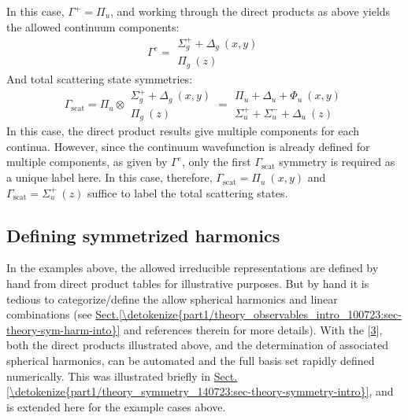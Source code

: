 \documentclass[letterpaper,table,10pt,english]{jupyterBook}
\begin{document}
\sphinxAtStartPar
In this case, \(\Gamma^{+} = \Pi_u\), and \sphinxhyphen{} working through the direct products as above \sphinxhyphen{} yields the allowed continuum components:
\label{equation:part2/sym-fitting-intro_220423:1599210e-02fb-4bfc-974e-9176b1bf6f06}\begin{equation}
\Gamma^{e}=\begin{array}{c}
\Sigma_{g}^{+} + \Delta_{g}~(x,y)\\
\Pi_{g}~(z)
\end{array}
\end{equation}
\sphinxAtStartPar
And total scattering state symmetries:
\label{equation:part2/sym-fitting-intro_220423:e5dc7ea3-dfe1-4ad6-bde6-51e3379fd7e6}\begin{equation}
\Gamma_{\mathrm{scat}}=\Pi_{u}\otimes\begin{array}{c}
\Sigma_{g}^{+} + \Delta_{g}~(x,y)\\
\Pi_{g}~(z)
\end{array}=\begin{array}{c}
\Pi_{u} + \Delta_{u} + \Phi_{u}~(x,y)\\
\Sigma_{u}^{+} + \Sigma_{u}^{-} + \Delta_{u}~(z)
\end{array}
\end{equation}
\sphinxAtStartPar
In this case, the direct product results give multiple components for each continua. However, since the continuum wavefunction is already defined for multiple components, as given by \(\Gamma^{e}\), only the first \(\Gamma_{\mathrm{scat}}\) symmetry is required as a unique label here. In this case, therefore, \(\Gamma_{\mathrm{scat}} = \Pi_{u}~(x,y)\) and \(\Gamma_{\mathrm{scat}} =\Sigma_{u}^{+}~(z)\) suffice to label the total scattering states.


\subsection{Defining symmetrized harmonics}
\label{\detokenize{part2/sym-fitting-intro_220423:defining-symmetrized-harmonics}}
\sphinxAtStartPar
In the examples above, the allowed irreducible representations are defined by hand from direct product tables for illustrative purposes. But \sphinxhyphen{} by hand \sphinxhyphen{} it is tedious to categorize/define the allow spherical harmonics and linear combinations (see \hyperref[\detokenize{part1/theory_observables_intro_100723:sec-theory-sym-harm-into}]{Sect.\@ \ref{\detokenize{part1/theory_observables_intro_100723:sec-theory-sym-harm-into}}} and references therein for more details). With the  {[}\hyperlink{cite.backmatter/bibliography:id668}{3}{]}, both the direct products illustrated above, and the determination of associated spherical harmonics, can be automated and the full basis set rapidly defined numerically. This was illustrated briefly in \hyperref[\detokenize{part1/theory_symmetry_140723:sec-theory-symmetry-intro}]{Sect.\@ \ref{\detokenize{part1/theory_symmetry_140723:sec-theory-symmetry-intro}}}, and is extended here for the example cases above.
\end{document}

